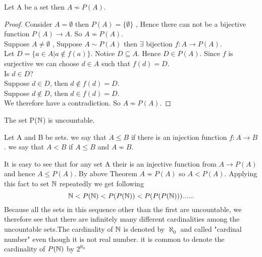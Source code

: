 \documentclass[a4paper,english,12pt]{article}   	%
\begin{document}
\begin{thm} Let A be a set then $A \nsim P(A) $.
\end{thm}
\begin{proof} Consider $A = \emptyset$ then $P(A) = \{ \emptyset \}$ , Hence there can not be a bijective function $P(A) \to A$. So $A \nsim P(A) $.\\
Suppose $A \neq \emptyset$ , Suppose $A \sim P(A)$ then $\exists$ bijection $f \colon A \to P(A)$.\\
Let $D=\{a \in A  | a \notin f(a)\}$. Notice $D \subseteq A$. Hence $D \in P(A)$. Since $f$ is surjective we can choose $d \in A$ such that $f(d)=D$.\\
Is $d \in D$?\\
Suppose $d \in D$, then $d \notin f(d)=D$.\\
Suppose $d \notin D$, then $d \in f(d)=D$.\\
We therefore have a contradiction. So $A \nsim P(A)$.
\end{proof}
\begin{cor} The set P($\mathbb{N}$) is uncountable.
\end{cor}
\begin{defn} Let A and B be sets. we say that $A \leq B$ if there is an injection function $f \colon A \to B$. we say that $A < B$ if $A \leq B$ and $A \nsim B$.
\end{defn}
It is easy to see that for any set A their is an injective function from $A \to P(A)$ and hence $A \leq P(A)$. By above Theorem $A \nsim P(A)$ so $A < P(A)$. Applying this fact to set $\mathbb{N}$ repeatedly we get following
\[ \mathbb{N} < P(\mathbb{N}) < P(P(\mathbb{N})) < P(P(P(\mathbb{N})))......\]
Because all the sets in this sequence other than the first are uncountable, we therefore see that there are infinitely many different cardinalities among the uncountable sets.The cardinality of $\mathbb{N}$ is denoted by $\aleph _{0}$ and called "cardinal number" even though it is not real number. it is common to denote the cardinality of $P(\mathbb{N})$ by  $ 2 ^{\aleph _{0}}$
\end{document}
